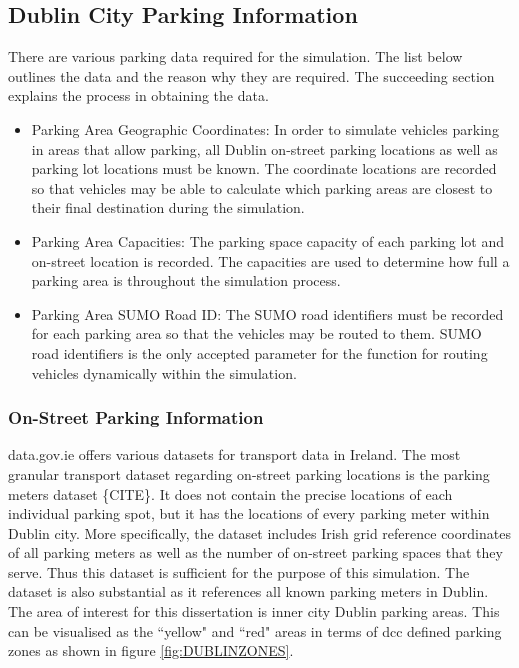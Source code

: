 \subsection{Dublin City Parking Information}
There are various parking data required for the simulation. The list below outlines the data and the reason why they are required. The succeeding section explains the process in obtaining the data.

\begin{itemize}
    \item Parking Area Geographic Coordinates: In order to simulate vehicles parking in areas that allow parking, all Dublin on-street parking locations as well as parking lot locations must be known. The coordinate locations are recorded so that vehicles may be able to calculate which parking areas are closest to their final destination during the simulation.
    \item Parking Area Capacities: The parking space capacity of each parking lot and on-street location is recorded. The capacities are used to determine how full a parking area is throughout the simulation process.
    \item Parking Area SUMO Road ID: The SUMO road identifiers must be recorded for each parking area so that the vehicles may be routed to them. SUMO road identifiers is the only accepted parameter for the function for routing vehicles dynamically within the simulation.
\end{itemize}

\subsubsection{On-Street Parking Information}\label{ssec:on-street_parking_info}
data.gov.ie offers various datasets for transport data in Ireland. The most granular transport dataset regarding on-street parking locations is the parking meters dataset \{CITE\}. It does not contain the precise locations of each individual parking spot, but it has the locations of every parking meter within Dublin city. More specifically, the dataset includes Irish grid reference coordinates of all parking meters as well as the number of on-street parking spaces that they serve. Thus this dataset is sufficient for the purpose of this simulation. The dataset is also substantial as it references all known parking meters in Dublin. The area of interest for this dissertation is inner city Dublin parking areas. This can be visualised as the ``yellow" and ``red" areas in terms of \ac{dcc} defined parking zones as shown in figure \ref{fig:DUBLINZONES}. 

